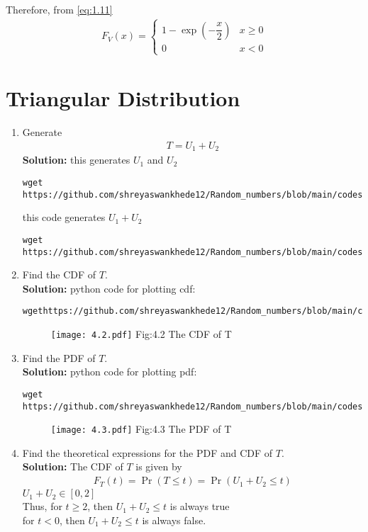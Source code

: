 \documentclass[journal,12pt,twocolumn]{IEEEtran}
\renewcommand\thesection{\arabic{section}}
\providecommand{\pr}[1]{\ensuremath{\Pr\left(#1\right)}}
\providecommand{\brak}[1]{\ensuremath{\left(#1\right)}}
\theoremstyle{remark}
\newcommand{\solution}{\noindent \textbf{Solution: }}
\numberwithin{equation}{section}
\begin{document}
\begin{enumerate}[label=\thesection.\arabic*
,ref=\thesection.\theenumi]
	Therefore, from \eqref{eq:1.11}
	\begin{align}
		F_V(x) = 
		\begin{cases}
			1-\exp\brak{-\dfrac{x}{2}} & x \ge 0 \\
			0 & x < 0
		\end{cases}
	\end{align}
%
\end{enumerate}
\section{Triangular Distribution}
\begin{enumerate}[label=\thesection.\arabic*
,ref=\thesection.\theenumi]
%
\item Generate 
	\begin{align}
		T = U_1+U_2
	\end{align}
\solution
this generates $U_1$ and $U_2$
\begin{lstlisting}
wget https://github.com/shreyaswankhede12/Random_numbers/blob/main/codes/4.1_gen_u1_u2.c
\end{lstlisting}
this code generates $U_1 + U_2$
\begin{lstlisting}
wget https://github.com/shreyaswankhede12/Random_numbers/blob/main/codes/4.1_gen_u1+u2.c
\end{lstlisting} 
\item Find the CDF of $T$.\\
\solution python code for plotting cdf:
\begin{lstlisting}
wgethttps://github.com/shreyaswankhede12/Random_numbers/blob/main/codes/4.2.py
\end{lstlisting}
\begin{figure}
\centering
\texttt{[image: 4.2.pdf]}
Fig:4.2  The CDF of T
\end{figure}
\item Find the PDF of $T$.\\
\solution python code for plotting pdf:
\begin{lstlisting}
wget https://github.com/shreyaswankhede12/Random_numbers/blob/main/codes/4.3.py
\end{lstlisting}
\begin{figure}
\centering
\texttt{[image: 4.3.pdf]}
Fig:4.3  The PDF of T
\end{figure} 
\item Find the theoretical expressions for the PDF and CDF of $T$.\\
\solution The CDF of $T$ is given by
	\begin{align}
		F_T(t) = \pr{T \le t} = \pr{U_1 + U_2 \le t}	
	\end{align}		
	$ U_1 + U_2 \in [0,2]$\\
	Thus, for $t \ge 2$, then $U_1 + U_2 \le t$ is always true\\  for $t < 0$, then $U_1 + U_2 \le t$ is always false.
	

\end{enumerate}
\end{document}
